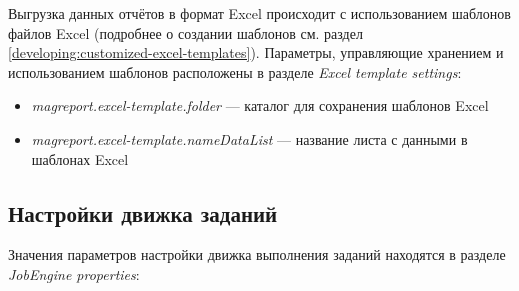 \documentclass[../user-manual.tex]{subfiles}
\begin{document}
	Выгрузка данных отчётов в формат Excel происходит с использованием шаблонов файлов Excel (подробнее о создании шаблонов см. раздел \ref{developing:customized-excel-templates}). Параметры, управляющие хранением и использованием шаблонов расположены в разделе \textit{Excel template settings}:
	
	\begin{itemize}
		\item \textit{magreport.excel-template.folder} --- каталог для сохранения шаблонов Excel
		
		\item \textit{magreport.excel-template.nameDataList} --- название листа с данными в шаблонах Excel
	\end{itemize}
	
	\subsection{Настройки движка заданий}
	
	Значения параметров настройки движка выполнения заданий находятся в разделе \textit{JobEngine properties}:
	
\end{document}
